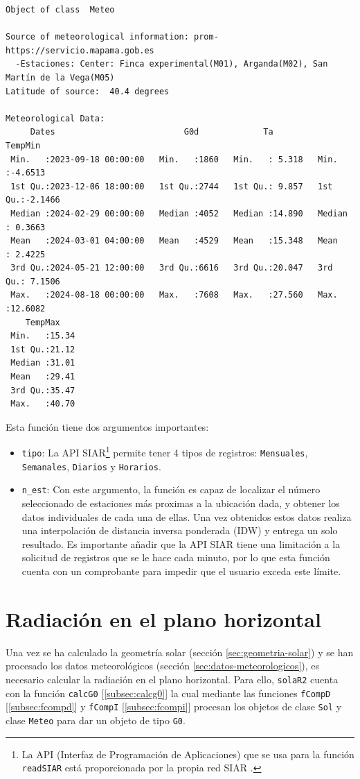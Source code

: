 \begin{verbatim}
Object of class  Meteo 

Source of meteorological information: prom-https://servicio.mapama.gob.es 
  -Estaciones: Center: Finca experimental(M01), Arganda(M02), San Martín de la Vega(M05) 
Latitude of source:  40.4 degrees

Meteorological Data:
     Dates                          G0d             Ta            TempMin       
 Min.   :2023-09-18 00:00:00   Min.   :1860   Min.   : 5.318   Min.   :-4.6513  
 1st Qu.:2023-12-06 18:00:00   1st Qu.:2744   1st Qu.: 9.857   1st Qu.:-2.1466  
 Median :2024-02-29 00:00:00   Median :4052   Median :14.890   Median : 0.3663  
 Mean   :2024-03-01 04:00:00   Mean   :4529   Mean   :15.348   Mean   : 2.4225  
 3rd Qu.:2024-05-21 12:00:00   3rd Qu.:6616   3rd Qu.:20.047   3rd Qu.: 7.1506  
 Max.   :2024-08-18 00:00:00   Max.   :7608   Max.   :27.560   Max.   :12.6082  
    TempMax     
 Min.   :15.34  
 1st Qu.:21.12  
 Median :31.01  
 Mean   :29.41  
 3rd Qu.:35.47  
 Max.   :40.70
\end{verbatim}

Esta función tiene dos argumentos importantes:
\begin{itemize}
\item \texttt{tipo}: La API SIAR\footnote{La API (Interfaz de Programación de Aplicaciones) que se usa para la función \texttt{readSIAR} está proporcionada por la propia red SIAR \cite{siar23}.} permite tener 4 tipos de registros: \texttt{Mensuales}, \texttt{Semanales}, \texttt{Diarios} y \texttt{Horarios}.
\item \texttt{n\_est}: Con este argumento, la función es capaz de localizar el número seleccionado de estaciones más proximas a la ubicación dada, y obtener los datos individuales de cada una de ellas. Una vez obtenidos estos datos realiza una interpolación de distancia inversa ponderada (IDW) y entrega un solo resultado. Es importante añadir que la API SIAR tiene una limitación a la solicitud de registros que se le hace cada minuto, por lo que esta función cuenta con un comprobante para impedir que el usuario exceda este límite.
\end{itemize}

\section{Radiación en el plano horizontal}
\label{sec:orga361dd4}
\label{sec:radiacion-plano-horizontal}
Una vez se ha calculado la geometría solar (sección \ref{sec:geometria-solar}) y se han procesado los datos meteorológicos (sección \ref{sec:datos-meteorologicos}), es necesario calcular la radiación en el plano horizontal. Para ello, \texttt{solaR2} cuenta con la función \texttt{calcG0} [\ref{subsec:calcg0}] la cual mediante las funciones \texttt{fCompD} [\ref{subsec:fcompd}] y \texttt{fCompI} [\ref{subsec:fcompi}] procesan los objetos de clase \texttt{Sol} y clase \texttt{Meteo} para dar un objeto de tipo \texttt{G0}.

